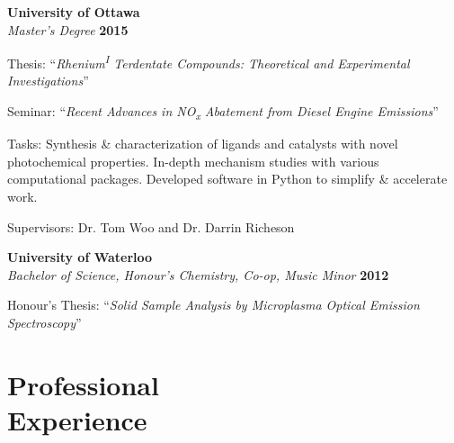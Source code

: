 \documentclass[margin,line]{resumecls}
\begin{document}
\begin{resume}
    \textbf{University of Ottawa}\\\vspace{1mm}%
    \textsl{Master's Degree} \hfill \textbf{2015}\vspace{-3mm}\\\vspace{-1mm}%
    \begin{list2}
        \item Thesis: ``\textit{Rhenium\textsuperscript{I} Terdentate Compounds: Theoretical and Experimental Investigations}''
        \item Seminar: ``\textit{Recent Advances in NO\textsubscript{x} Abatement from Diesel Engine Emissions}''
        \item Tasks: Synthesis \& characterization of ligands and catalysts with novel photochemical properties.
        In-depth mechanism studies with various computational packages.
        Developed software in Python to simplify \& accelerate work.
        \item Supervisors: Dr. Tom Woo and Dr. Darrin Richeson
    \end{list2}

    \textbf{University of Waterloo}\\\vspace{1mm}%
    \textsl{Bachelor of Science, Honour's Chemistry, Co-op, Music Minor} \hfill \textbf{2012}\vspace{-3mm}\\\vspace{-1mm}%
    \begin{list2}
        \item Honour's Thesis: ``\textit{Solid Sample Analysis by Microplasma Optical Emission Spectroscopy}''
    \end{list2}

    \section{%
    \mysidestyle Professional\\Experience}\label{sec:mysidestyle-professionalexperience}


\end{resume}
\end{document}
